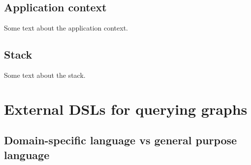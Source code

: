 \subsection*{Application context}

Some text about the application context.

\subsection*{Stack}

Some text about the stack.




\section{External DSLs for querying graphs}

\subsection{Domain-specific language vs general purpose language}



